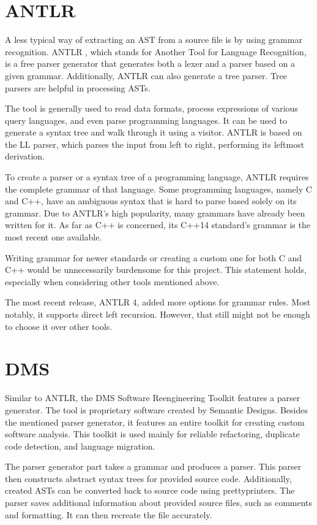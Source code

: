 \section{ANTLR}

A less typical way of extracting an AST from a source file is by using grammar
recognition.
ANTLR \citep{antlr:online}, which stands for Another Tool for 
Language Recognition, is a free 
parser generator that generates both a lexer and a parser based on 
a given grammar.
Additionally, ANTLR can also generate a tree parser.
Tree parsers are helpful in processing ASTs.

The tool is generally used to read data formats, process expressions 
of various query languages, and even parse programming languages.
It can be used to generate a syntax tree and walk through it using a visitor.
ANTLR is based on the LL parser, which parses the input from left to right, 
performing its leftmost derivation.

To create a parser or a syntax tree of a programming language, ANTLR requires 
the complete grammar of that language.
Some programming languages, namely C and C++, have an ambiguous syntax that 
is hard to parse based solely on its grammar.
Due to ANTLR's high popularity, many grammars have already been written 
for it.
As far as C++ is concerned, its C++14 standard's grammar is the most recent 
one available.

Writing grammar for newer standards or creating a custom one for both C and 
C++ would be unnecessarily burdensome for this project.
This statement holds, especially when considering other tools mentioned above.

The most recent release, ANTLR 4, added more options for grammar rules.
Most notably, it supports direct left recursion.
However, that still might not be enough to choose it over other tools.


\section{DMS}

Similar to ANTLR, the DMS Software Reengineering Toolkit \citep{dms:online}
features a parser generator.
The tool is proprietary software created by Semantic Designs.
Besides the mentioned parser generator, it features an entire toolkit for 
creating custom software analysis.
This toolkit is used mainly for reliable refactoring, duplicate code 
detection, and language migration.

The parser generator part takes a grammar and produces a parser.
This parser then constructs abstract syntax trees for provided source code.
Additionally, created ASTs can be converted back to source code using 
prettyprinters.
The parser saves additional information about provided source files, such as 
comments and formatting.
It can then recreate the file accurately.

